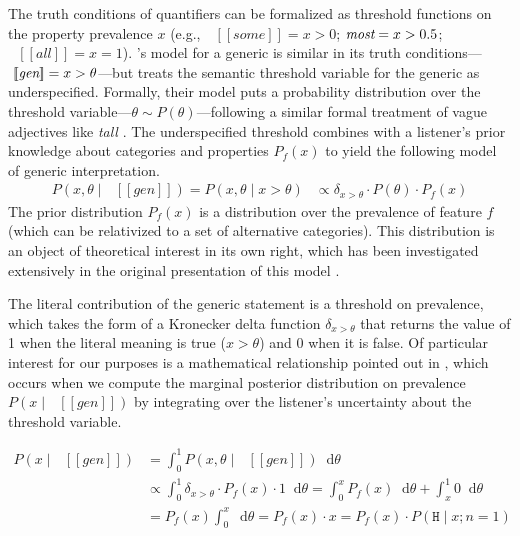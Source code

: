 \documentclass[10pt,letterpaper]{article}
\newcommand{\denote}[1]{\mbox{ $[\![ #1 ]\!]$}}
\begin{document}
The truth conditions of quantifiers can be formalized as threshold functions on the property prevalence $x$ (e.g., $\denote{some} = x > 0$; $\emph{most}= x > 0.5$; $\denote{all} = x = 1$). 's model for a generic is similar in its truth conditions---$\denote{\emph{gen}} = x > \theta$---but treats the semantic threshold variable for the generic as underspecified. 
Formally, their model puts a probability distribution over the threshold variable---$\theta \sim P(\theta)$---following a similar formal treatment of vague adjectives like \emph{tall} \cite{lassiter2017adjectival}. 
The underspecified threshold combines with a listener's prior knowledge about categories and properties $P_f(x)$ to yield the following model of generic interpretation.
\begin{align}
P (x, \theta \mid \denote{gen}) = P (x, \theta \mid x >  \theta) &\propto \delta_{x > \theta} \cdot P(\theta) \cdot P_f(x)  \label{eq:L0}
\end{align}
The prior distribution $P_f(x)$ is a distribution over the prevalence of feature $f$ (which can be relativized to a set of alternative categories). This distribution is an object of theoretical interest in its own right, which has been investigated extensively in the original presentation of this model \cite{tessler2019language,tessler2020learning}. 

The literal contribution of the generic statement is a threshold on prevalence, which takes the form of a Kronecker delta function $\delta_{x > \theta}$ that returns the value of 1 when the literal meaning is true ($x > \theta$) and 0 when it is false. 
Of particular interest for our purposes is a mathematical relationship pointed out in , which occurs when we compute the marginal posterior distribution on prevalence $P(x \mid \denote{gen})$ by integrating over the listener's uncertainty about the threshold variable. 

\begin{align}
P(x \mid \denote{gen}) &=  \int_{0}^{1} P (x, \theta \mid \denote{gen}) \mathop{}\!\mathrm{d}\theta \nonumber
\\
& \propto  \int_{0}^{1} \delta_{x > \theta}  \cdot P_f(x) \cdot 1 \mathop{}\!\mathrm{d}\theta \nonumber  = \int_{0}^{x} P_f(x) \mathop{}\!\mathrm{d}\theta + \int_{x}^{1} 0 \mathop{}\!\mathrm{d}\theta \nonumber  \\
 &    = P_f(x) \int_{0}^{x} \mathop{}\!\mathrm{d}\theta   =  P_f(x) \cdot x  = P_f(x) \cdot P(\texttt{H} \mid x; n=1)\label{eq:L0d}
\end{align}
\end{document}
